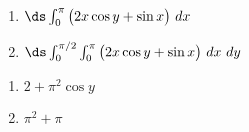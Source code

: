 {\begin{enumerate}
	\item $\ds \int_0^{\pi} \big(2x\cos y+ \sin x\big)\ dx$\\
	\item $\ds \int_{0}^{\pi/2} \int_0^{\pi} \big(2x\cos y+ \sin x\big)\ dx\ dy$
\end{enumerate}
}
{\begin{enumerate}
	\item $2+\pi^2\cos y$
	\item	$\pi^2+\pi$
\end{enumerate}
}
